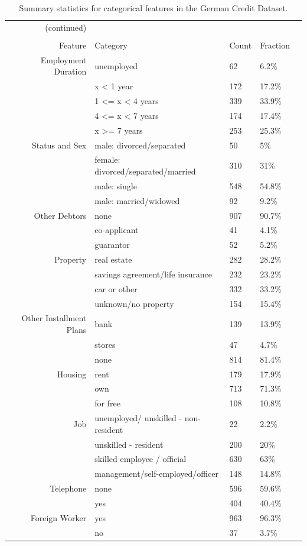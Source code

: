 \documentclass[12pt]{article}
\begin{document}
\begin{table}[!ht]
\centering
\begin{tabular}{rllll}
 (continued)& & &\\ \\
\hline
Feature & Category & Count & Fraction \\ 
  \hline
 Employment Duration & unemployed & 62 & 6.2\% \\ 
&x < 1 year & 172 & 17.2\% \\ 
&1  <= x < 4 years & 339 & 33.9\% \\ 
&4  <= x < 7 years & 174 & 17.4\% \\ 
&x >= 7 years & 253 & 25.3\% \\ 
\hline
Status and Sex & male: divorced/separated & 50 & 5\% \\ 
&female: divorced/separated/married & 310 & 31\% \\ 
&male: single & 548 & 54.8\% \\ 
&male: married/widowed & 92 & 9.2\% \\ 
\hline
 Other Debtors & none & 907 & 90.7\% \\ 
&co-applicant & 41 & 4.1\% \\ 
&guarantor & 52 & 5.2\% \\ 
\hline
  Property & real estate & 282 & 28.2\% \\ 
&savings agreement/life insurance & 232 & 23.2\% \\ 
&car or other& 332 & 33.2\% \\ 
&unknown/no property & 154 & 15.4\% \\ 
\hline
 Other Installment Plans & bank & 139 & 13.9\% \\ 
&stores & 47 & 4.7\% \\ 
&none & 814 & 81.4\% \\ 
\hline
Housing & rent & 179 & 17.9\% \\ 
&own & 713 & 71.3\% \\ 
&for free & 108 & 10.8\% \\ 
\hline
 Job & unemployed/ unskilled  - non-resident & 22 & 2.2\% \\ 
 & unskilled - resident & 200 & 20\% \\ 
 &skilled employee / official & 630 & 63\% \\ 
 &management/self-employed/officer & 148 & 14.8\% \\ 
 \hline
Telephone & none & 596 & 59.6\% \\ 
&yes & 404 & 40.4\% \\ 
 \hline
Foreign Worker & yes & 963 & 96.3\% \\ 
&no & 37 & 3.7\% \\ 
    \hline
\end{tabular}
\caption[Summary statistics for categorical features]{Summary statistics for categorical features in the German Credit Dataset.}\label{summary_categorical}
\end{table}
\end{document}
